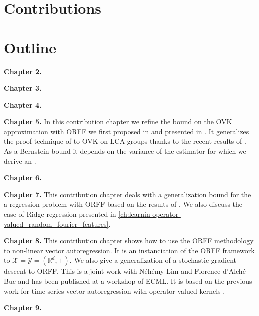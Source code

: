 \section{Contributions}

\section{Outline}

\textbf{Chapter 2.}

\textbf{Chapter 3.}

\textbf{Chapter 4.}

\textbf{Chapter 5.} 
In this contribution chapter we refine the bound on the \ac{OVK} approximation
with \ac{ORFF} we first proposed in \cite{brault2016random} and presented in
\cite{braultborne}. It generalizes the proof technique of \citet{Rahimi2007} to
\ac{OVK} on \ac{LCA} groups thanks to the recent results of
\citet{sutherland2015, tropp2015introduction, minsker2011some,
koltchinskii2013remark}. As a Bernstein bound it depends on the variance of the
estimator for which we derive an .

\textbf{Chapter 6.}

\textbf{Chapter 7.}
This contribution chapter deals with a generalization bound for the a
regression problem with ORFF based on the results of \citet{rahimi2009weighted,
maurer2016vector}.  We also discuss the case of Ridge regression presented in
\cref{ch:learnin operator-valued_random_fourier_features}.

\textbf{Chapter 8.}
This contribution chapter shows how to use the \acs{ORFF} methodology to
non-linear vector autoregression. It is an instanciation of the \acs{ORFF}
framework to $\mathcal{X}=\mathcal{Y}=(\mathbb{R}^d, +)$. We also give a
generalization of a stochastic gradient descent \citep{dai2014scalable} to
\acs{ORFF}. This is a joint work with N\'eh\'emy Lim and Florence d'Alch\'e-Buc
and has been published at a workshop of \acs{ECML}. It is based on the previous
work \citet{Lim2015} for time series vector autoregression with operator-valued
kernels \cite{brault2016scaling}.

\textbf{Chapter 9.}


